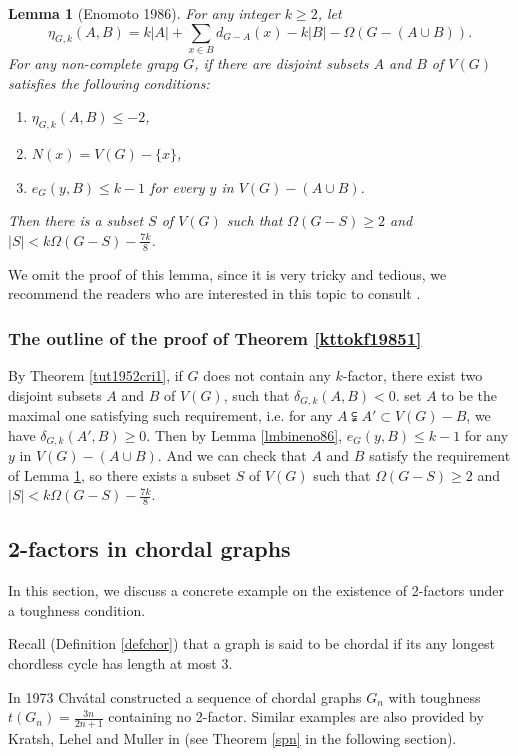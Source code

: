 \documentclass[12pt]{report}
\newtheorem{lemma}{Lemma}
\begin{document}
\begin{lemma}[Enomoto 1986]\label{procineno86}
For any integer $k\ge2$, let $$\eta_{G,k}(A,B)=k|A|+\sum_{x\in B}d_{G-A}(x)-k|B|-\Omega(G-(A\cup B)).$$ For any non-complete grapg $G$, if there are disjoint subsets $A$ and $B$ of $V(G)$ satisfies the following conditions:
\begin{enumerate}
\item $\eta_{G,k}(A,B)\le-2$,
\item $N(x)=V(G)-\{x\}$,
\item $e_G(y,B)\le k-1$ for every $y$ in $V(G)-(A\cup B)$.
\end{enumerate}
Then there is a subset $S$ of $V(G)$ such that $\Omega(G-S)\ge2$ and $|S|<k\Omega(G-S)-\frac{7k}{8}$.
\end{lemma}

We omit the proof of this lemma, since it is very tricky and tedious, we recommend the readers who are interested in this topic to consult \cite{enomoto1986toughness}.



\subsubsection{The outline of the proof of Theorem \ref{kttokf19851}}
By Theorem \ref{tut1952cri1}, if $G$ does not contain any $k$-factor, there exist two disjoint subsets $A$ and $B$ of $V(G)$, such that $\delta_{G,k}(A,B)<0$. set $A$ to be the maximal one satisfying such requirement, i.e. for any $A\subsetneqq A'\subset V(G)-B$, we have $\delta_{G,k}(A',B)\ge0$. Then by Lemma \ref{lmbineno86}, $e_G(y,B)\le k-1$ for any $y$ in $V(G)-(A\cup B)$. And we can check that $A$ and $B$ satisfy the requirement of Lemma \ref{procineno86}, so there exists a subset $S$ of $V(G)$ such that $\Omega(G-S)\ge2$ and $|S|<k\Omega(G-S)-\frac{7k}{8}$.






\subsection{2-factors in chordal graphs}

In this section, we discuss a concrete example on the existence of 2-factors under a toughness condition.

Recall (Definition \ref{defchor}) that a graph is said to be chordal if its any longest chordless cycle has length at most 3.

In 1973 Chv{\'a}tal constructed a sequence of  chordal graphs $G_n$ with toughness $t(G_n)=\frac{3n}{2n+1}$ containing no 2-factor. Similar examples are also provided by Kratsh, Lehel and Muller in \cite{kratsch1996toughness} (see Theorem \ref{spn} in the following section).
\end{document}
